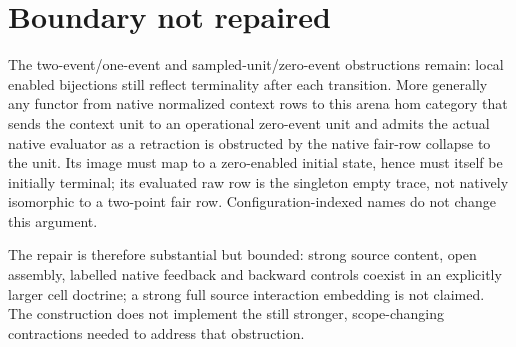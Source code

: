 \documentclass[11pt]{article}
\begin{document}
\section{Boundary not repaired}
The two-event/one-event and sampled-unit/zero-event obstructions remain:
local enabled bijections still reflect terminality after each transition.
More generally any functor from native normalized context rows to this
arena hom category that sends the context unit to an operational zero-event
unit and admits the actual native evaluator as a retraction is obstructed
by the native fair-row collapse to the unit. Its image must map to a
zero-enabled initial state, hence must itself be initially terminal;
its evaluated raw row is the singleton empty trace, not natively
isomorphic to a two-point fair row. Configuration-indexed names do not
change this argument.

The repair is therefore substantial but bounded: strong source content,
open assembly, labelled native feedback and backward controls coexist in
an explicitly larger cell doctrine; a strong full source interaction
embedding is not claimed. The construction does not implement the still
stronger, scope-changing contractions needed to address that obstruction.
\end{document}
